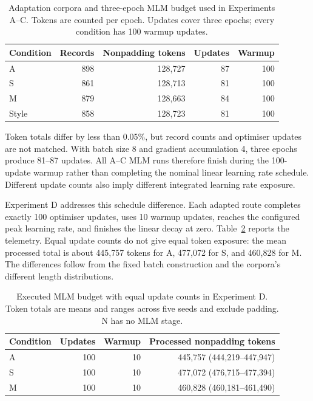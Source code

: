 \documentclass[pdflatex,sn-basic]{sn-jnl}
\begin{document}
\begin{table}[!htbp]
\caption{Adaptation corpora and three-epoch MLM budget used in Experiments
A--C. Tokens are counted per epoch. Updates cover three epochs; every condition
has 100 warmup updates.}
\label{tab:budgets}
\centering\small
\begin{tabular}{@{}lrrrr@{}}
\toprule
Condition & Records & Nonpadding tokens & Updates & Warmup \\
\midrule
A & 898 & 128,727 & 87 & 100 \\
S & 861 & 128,713 & 81 & 100 \\
M & 879 & 128,663 & 84 & 100 \\
Style & 858 & 128,723 & 81 & 100 \\
\bottomrule
\end{tabular}
\end{table}

Token totals differ by less than 0.05\%, but record counts and optimiser
updates are not matched. With batch size 8 and gradient accumulation 4,
three epochs produce 81--87 updates. All A--C MLM runs therefore finish during
the 100-update warmup rather than completing the nominal linear learning rate
schedule. Different update counts also imply different integrated
learning rate exposure.

Experiment D addresses this schedule difference. Each adapted route completes
exactly 100 optimiser updates, uses 10 warmup updates, reaches the configured
peak learning rate, and finishes the linear decay at zero. Table~\ref{tab:equal_update_budget}
reports the telemetry. Equal update counts do not give equal token exposure:
the mean processed total is about 445,757 tokens for A, 477,072 for S, and
460,828 for M. The differences follow from the fixed batch construction and
the corpora's different length distributions.

\begin{table}[!htbp]
\caption{Executed MLM budget with equal update counts in Experiment D. Token totals are
means and ranges across five seeds and exclude padding. N has no MLM stage.}
\label{tab:equal_update_budget}
\centering\small
\begin{tabular}{@{}lrrr@{}}
\toprule
Condition & Updates & Warmup & Processed nonpadding tokens \\
\midrule
A & 100 & 10 & 445,757 (444,219--447,947) \\
S & 100 & 10 & 477,072 (476,715--477,394) \\
M & 100 & 10 & 460,828 (460,181--461,490) \\
\bottomrule
\end{tabular}
\end{table}
\end{document}
